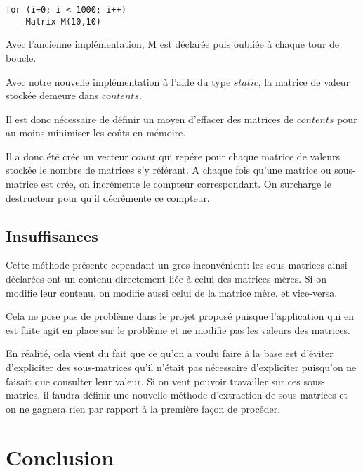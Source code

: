 \documentclass[a4paper,11pt]{article}
\begin{document}
\begin{lstlisting}
for (i=0; i < 1000; i++)
    Matrix M(10,10)
\end{lstlisting}

Avec l'ancienne implémentation, M est déclarée puis oubliée à chaque tour de boucle.

Avec notre nouvelle implémentation à l'aide du type $static$, la matrice de valeur stockée demeure dans $contents$.

Il est donc nécessaire de définir un moyen d'effacer des matrices de $contents$ pour au moins minimiser les coûts en mémoire.

Il a donc été crée un vecteur $count$ qui repére pour chaque matrice de valeurs stockée le nombre de matrices s'y référant. A chaque fois qu'une matrice ou sous-matrice est crée, on incrémente le compteur correspondant. On surcharge le destructeur pour qu'il décrémente ce compteur.

\subsection{Insuffisances}

Cette méthode présente cependant un gros inconvénient: les sous-matrices ainsi déclarées ont un contenu directement liée à celui des matrices mères. Si on modifie leur contenu, on modifie aussi celui de la matrice mère. et vice-versa.

Cela ne pose pas de problème dans le projet proposé puisque l'application qui en est faite agit en place sur le problème et ne modifie pas les valeurs des matrices.

En réalité, cela vient du fait que ce qu'on a voulu faire à la base est d'éviter d'expliciter des sous-matrices qu'il n'était pas nécessaire d'expliciter puisqu'on ne faisait que consulter leur valeur. Si on veut pouvoir travailler sur ces sous-matries, il faudra définir une nouvelle méthode d'extraction de sous-matrices et on ne gagnera rien par rapport à la première façon de procéder.

\section*{Conclusion}
\end{document}
